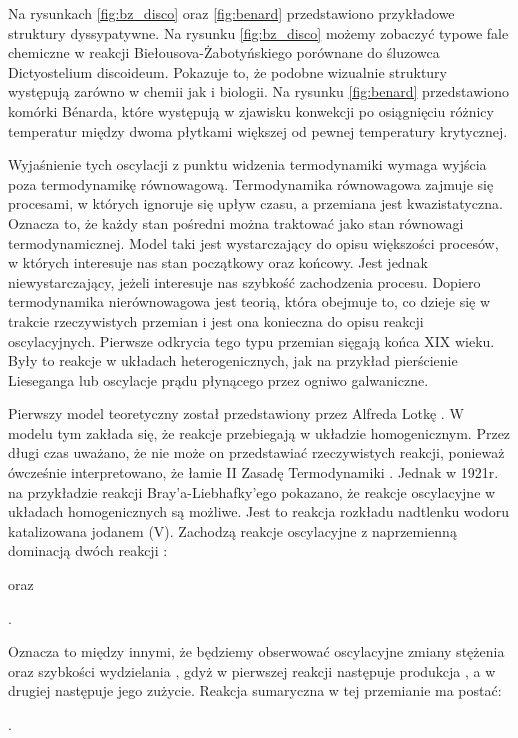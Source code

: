 \documentclass[10pt, a4paper, twoside, onecolumn]{article}
\numberwithin{equation}{section}
\begin{document}
	Na rysunkach \ref{fig:bz_disco} oraz \ref{fig:benard} przedstawiono przykładowe struktury dyssypatywne. Na rysunku \ref{fig:bz_disco} możemy zobaczyć typowe fale chemiczne w reakcji Biełousova-Żabotyńskiego porównane do śluzowca Dictyostelium discoideum. Pokazuje to, że podobne wizualnie struktury występują zarówno w chemii jak i biologii. Na rysunku \ref{fig:benard} przedstawiono komórki B\'{e}narda, które występują w zjawisku konwekcji po osiągnięciu różnicy temperatur między dwoma płytkami większej od pewnej temperatury krytycznej. \par
	Wyjaśnienie tych oscylacji z punktu widzenia termodynamiki wymaga wyjścia poza termodynamikę równowagową. Termodynamika równowagowa zajmuje się procesami, w których ignoruje się upływ czasu, a przemiana jest kwazistatyczna. Oznacza to, że każdy stan pośredni można traktować jako stan równowagi termodynamicznej. Model taki jest wystarczający do opisu większości procesów, %
	w których interesuje nas stan początkowy oraz końcowy. Jest jednak niewystarczający, jeżeli interesuje nas szybkość zachodzenia procesu. Dopiero termodynamika nierównowagowa jest teorią, która obejmuje to, co dzieje się w trakcie rzeczywistych przemian i jest ona konieczna do opisu reakcji oscylacyjnych. Pierwsze odkrycia tego typu przemian sięgają końca XIX wieku. Były to reakcje w układach heterogenicznych, jak na przykład pierścienie Lieseganga lub oscylacje prądu płynącego przez ogniwo galwaniczne. \par
	Pierwszy model teoretyczny został przedstawiony przez Alfreda Lotkę \cite{lotka}. W modelu tym zakłada się, że reakcje przebiegają w układzie homogenicznym. Przez długi czas uważano, że nie może on przedstawiać rzeczywistych reakcji, ponieważ ówcześnie interpretowano, że łamie II Zasadę Termodynamiki \cite{orlik_sily_w_przyrodzie}. Jednak w 1921r. na przykładzie reakcji Bray'a-Liebhafky'ego pokazano, że reakcje oscylacyjne w układach homogenicznych są możliwe. Jest to reakcja rozkładu nadtlenku wodoru katalizowana jodanem (V). Zachodzą reakcje oscylacyjne z naprzemienną dominacją dwóch reakcji \cite{orlik}:
	\begin{center}
	\end{center}
	oraz
	\begin{center}
		.
	\end{center}
	Oznacza to między innymi, że będziemy obserwować oscylacyjne zmiany stężenia  oraz szybkości wydzielania , gdyż w pierwszej reakcji następuje produkcja , a w drugiej następuje jego zużycie. Reakcja sumaryczna w tej przemianie ma postać: 
	\begin{center}
		.
	\end{center}
	
\end{document}
